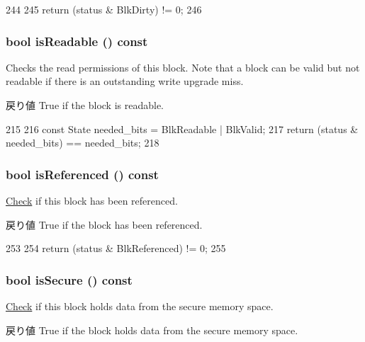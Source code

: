 \begin{DoxyCode}
244     {
245         return (status & BlkDirty) != 0;
246     }
\end{DoxyCode}
\hypertarget{classCacheBlk_a3d7f091ba732d3899bcb34dde9fbfd63}{
\subsubsection[{isReadable}]{\setlength{\rightskip}{0pt plus 5cm}bool isReadable () const}}
\label{classCacheBlk_a3d7f091ba732d3899bcb34dde9fbfd63}
Checks the read permissions of this block. Note that a block can be valid but not readable if there is an outstanding write upgrade miss. \begin{DoxyReturn}{戻り値}
True if the block is readable. 
\end{DoxyReturn}



\begin{DoxyCode}
215     {
216         const State needed_bits = BlkReadable | BlkValid;
217         return (status & needed_bits) == needed_bits;
218     }
\end{DoxyCode}
\hypertarget{classCacheBlk_abeb27e8f22de6b760e272839303a8bfa}{
\subsubsection[{isReferenced}]{\setlength{\rightskip}{0pt plus 5cm}bool isReferenced () const}}
\label{classCacheBlk_abeb27e8f22de6b760e272839303a8bfa}
\hyperlink{classCheck}{Check} if this block has been referenced. \begin{DoxyReturn}{戻り値}
True if the block has been referenced. 
\end{DoxyReturn}



\begin{DoxyCode}
253     {
254         return (status & BlkReferenced) != 0;
255     }
\end{DoxyCode}
\hypertarget{classCacheBlk_a3110ebf17828782ae5aeced7396cfff2}{
\subsubsection[{isSecure}]{\setlength{\rightskip}{0pt plus 5cm}bool isSecure () const}}
\label{classCacheBlk_a3110ebf17828782ae5aeced7396cfff2}
\hyperlink{classCheck}{Check} if this block holds data from the secure memory space. \begin{DoxyReturn}{戻り値}
True if the block holds data from the secure memory space. 
\end{DoxyReturn}




